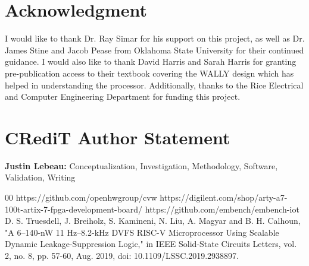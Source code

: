 \documentclass[conference]{IEEEtran}
\begin{document}
\section*{Acknowledgment}

I would like to thank Dr. Ray Simar for his support on this project, as well as Dr. James Stine and Jacob Pease from Oklahoma State University for their continued guidance. I would also like to thank David Harris and Sarah Harris for granting pre-publication access to their textbook covering the WALLY design which has helped in understanding the processor. Additionally, thanks to the Rice Electrical and Computer Engineering Department for funding this project.

\section*{CRediT Author Statement}
\textbf{Justin Lebeau:}
Conceptualization, Investigation, Methodology, Software, Validation, Writing

\begin{thebibliography}{00}
 https://github.com/openhwgroup/cvw
 https://digilent.com/shop/arty-a7-100t-artix-7-fpga-development-board/
 https://github.com/embench/embench-iot
 D. S. Truesdell, J. Breiholz, S. Kamineni, N. Liu, A. Magyar and B. H. Calhoun, "A 6–140-nW 11 Hz–8.2-kHz DVFS RISC-V Microprocessor Using Scalable Dynamic Leakage-Suppression Logic," in IEEE Solid-State
Circuits Letters, vol. 2, no. 8, pp. 57-60, Aug. 2019, doi: 10.1109/LSSC.2019.2938897.

\end{thebibliography}
\end{document}
